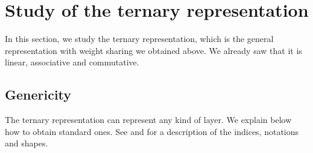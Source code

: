 \section{Study of the ternary representation}
\label{sec:ternary}

In this section, we study the ternary representation, which is the general representation with weight sharing we obtained above. We already saw that it is linear, associative and commutative.

\subsection{Genericity}
\label{sec:gen}


The ternary representation can represent any kind of layer. We explain below how to obtain standard ones. See  and  for a description of the indices, notations and shapes.

